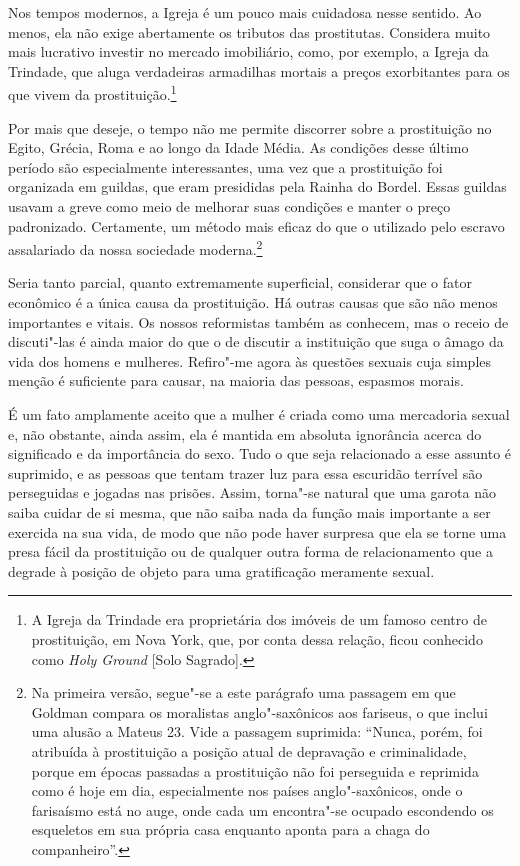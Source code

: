 Nos tempos modernos, a Igreja é um pouco mais cuidadosa nesse sentido.
Ao menos, ela não exige abertamente os tributos das prostitutas. Considera
muito mais lucrativo investir no mercado imobiliário, como, por
exemplo, a Igreja da Trindade, que aluga verdadeiras armadilhas mortais
a preços exorbitantes para os que vivem da prostituição.\footnote{A
  Igreja da Trindade era proprietária dos imóveis de um famoso centro de
  prostituição, em Nova York, que, por conta dessa relação, ficou
  conhecido como \emph{Holy Ground} {[}Solo Sagrado{]}.}

Por mais que deseje, o tempo não me permite discorrer sobre a
prostituição no Egito, Grécia, Roma e ao longo da Idade Média. As
condições desse último período são especialmente interessantes, uma vez
que a prostituição foi organizada em guildas, que eram presididas pela Rainha do
Bordel. Essas guildas usavam a greve como meio de melhorar suas
condições e manter o preço padronizado. Certamente, um método mais
eficaz do que o utilizado pelo escravo assalariado da nossa sociedade
moderna.\footnote{Na primeira versão, segue"-se a este parágrafo uma
  passagem em que Goldman compara os moralistas anglo"-saxônicos aos
  fariseus, o que inclui uma alusão a Mateus 23. Vide a passagem
  suprimida: ``Nunca, porém, foi atribuída à prostituição a posição
  atual de depravação e criminalidade, porque em épocas passadas a
  prostituição não foi perseguida e reprimida como é hoje em dia,
  especialmente nos países anglo"-saxônicos, onde o farisaísmo está no
  auge, onde cada um encontra"-se ocupado escondendo os esqueletos em sua
  própria casa enquanto aponta para a chaga do companheiro''.}

Seria tanto parcial, quanto extremamente superficial, considerar que o
fator econômico é a única causa da prostituição. Há outras causas que
são não menos importantes e vitais. Os nossos reformistas também as
conhecem, mas o receio de discuti"-las é ainda maior do que o de discutir
a instituição que suga o âmago da vida dos homens e mulheres. Refiro"-me
agora às questões sexuais cuja simples menção é suficiente para causar,
na maioria das pessoas, espasmos morais.

É um fato amplamente aceito que a mulher é criada como uma mercadoria
sexual e, não obstante, ainda assim, ela é mantida em absoluta
ignorância acerca do significado e da importância do sexo. Tudo o que
seja relacionado a esse assunto é suprimido, e as pessoas que tentam
trazer luz para essa escuridão terrível são perseguidas e jogadas nas
prisões. Assim, torna"-se natural que uma garota não saiba cuidar de si
mesma, que não saiba nada da função mais importante a ser exercida na
sua vida, de modo que não pode haver surpresa que ela se torne uma presa
fácil da prostituição ou de qualquer outra forma de relacionamento que a
degrade à posição de objeto para uma gratificação meramente sexual.

